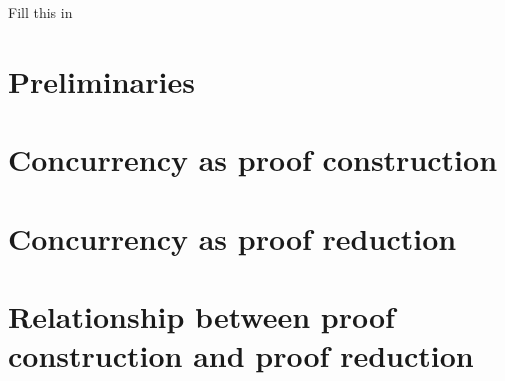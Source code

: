 \documentclass[
  tufte-book,
  notoc,
  biblatex={
    citestyle=authoryear-comp,
    autocite=footnote,
    maxcitenames=3,
    bibstyle=authoryear,
    mergedate=basic,
    maxbibnames=99,
    backref=true,
    doi=false,
    isbn=false,
  }
]{tufte-thesis}
\begin{document}
\begin{acknowledgments}
  Fill this in
\end{acknowledgments}

\tableofcontents

\mainmatter



\part{Preliminaries}\label{part:preliminaries}




 \part{Concurrency as proof construction}\label{part:proof-construction}



% 

% 


\part{Concurrency as proof reduction}\label{part:proof-reduction}




\part{Relationship between proof construction and proof reduction}\label{part:comparison}




\appendix



\backmatter

\printbibliography
\end{document}
